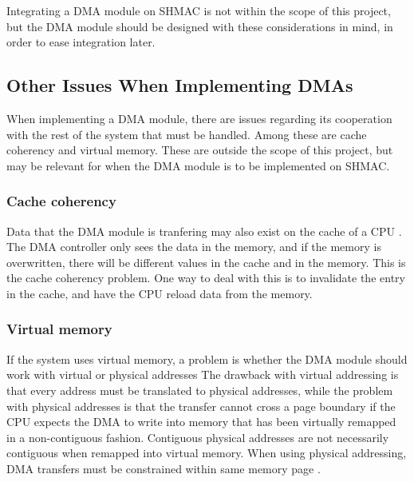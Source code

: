 Integrating a DMA module on SHMAC is not within the scope of this project, but the DMA module should be designed with these considerations in mind, in order to ease integration later.


\subsection{Other Issues When Implementing DMAs}

When implementing a DMA module, there are issues regarding its cooperation with the rest of the system that must be handled.
Among these are cache coherency and virtual memory.
These are outside the scope of this project, but may be relevant for when the DMA module is to be implemented on SHMAC.

\subsubsection{Cache coherency}
Data that the DMA module is tranfering may also exist on the cache of a CPU \cite{computer-construction}.
The DMA controller only sees the data in the memory, and if the memory is overwritten, there will be different values in the cache and in the memory.
This is the cache coherency problem.
One way to deal with this is to invalidate the entry in the cache, and have the CPU reload data from the memory.

\subsubsection{Virtual memory}
If the system uses virtual memory, a problem is whether the DMA module should work with virtual or physical addresses 
The drawback with virtual addressing is that every address must be translated to physical addresses,
while the problem with physical addresses is that the transfer cannot cross a page boundary if the CPU expects the DMA to write into memory that has been virtually remapped in a non-contiguous fashion.
Contiguous physical addresses are not necessarily contiguous when remapped into virtual memory.
When using physical addressing, DMA transfers must be constrained within same memory page \cite{computer-construction}.

